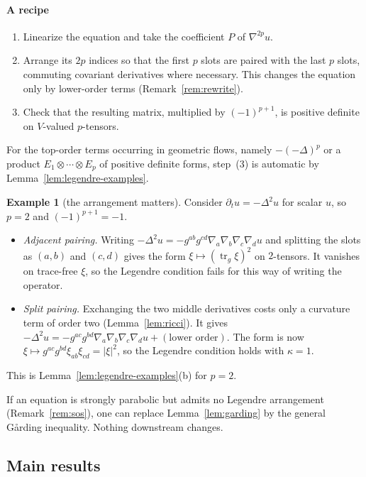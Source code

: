 \documentclass[11pt,reqno]{amsart}
\theoremstyle{definition}
\newtheorem{example}[theorem]{Example}
\theoremstyle{remark}
\newcommand{\tr}{\operatorname{tr}}
\newcommand{\abs}[1]{\lvert #1\rvert}
\numberwithin{equation}{section}
\begin{document}
\paragraph{A recipe}
\begin{enumerate}[label=(\arabic*),nosep]
\item Linearize the equation and take the coefficient $P$ of $\nabla^{2p}u$.
\item Arrange its $2p$ indices so that the first $p$ slots are paired with the last $p$ slots,
  commuting covariant derivatives where necessary. This changes the equation only by lower-order
  terms (Remark~\ref{rem:rewrite}).
\item Check that the resulting matrix, multiplied by $(-1)^{p+1}$, is positive definite on
  $V$-valued $p$-tensors.
\end{enumerate}
For the top-order terms occurring in geometric flows, namely $-(-\Delta)^p$ or a product
$E_1\otimes\cdots\otimes E_p$ of positive definite forms, step~(3) is automatic by
Lemma~\ref{lem:legendre-examples}.

\begin{example}[the arrangement matters]\label{ex:bilaplacian}
Consider $\partial_tu=-\Delta^2u$ for scalar $u$, so $p=2$ and $(-1)^{p+1}=-1$.
\begin{itemize}[nosep]
\item \emph{Adjacent pairing.} Writing
  $-\Delta^2u=-g^{ab}g^{cd}\nabla_a\nabla_b\nabla_c\nabla_du$ and splitting the slots as $(a,b)$ and
  $(c,d)$ gives the form $\xi\mapsto(\tr_g\xi)^2$ on $2$-tensors. It vanishes on trace-free $\xi$, so
  the Legendre condition fails for this way of writing the operator.
\item \emph{Split pairing.} Exchanging the two middle derivatives costs only a curvature term of
  order two (Lemma~\ref{lem:ricci}). It gives
  $-\Delta^2u=-g^{ac}g^{bd}\nabla_a\nabla_b\nabla_c\nabla_du+(\text{lower order})$. The form is now
  $\xi\mapsto g^{ac}g^{bd}\xi_{ab}\xi_{cd}=\abs\xi^2$, so the Legendre condition holds with
  $\kappa=1$.
\end{itemize}
This is Lemma~\ref{lem:legendre-examples}(b) for $p=2$.
\end{example}

If an equation is strongly parabolic but admits no Legendre arrangement (Remark~\ref{rem:sos}), one
can replace Lemma~\ref{lem:garding} by the general G\aa rding inequality. Nothing downstream changes.

\subsection{Main results}
\end{document}

